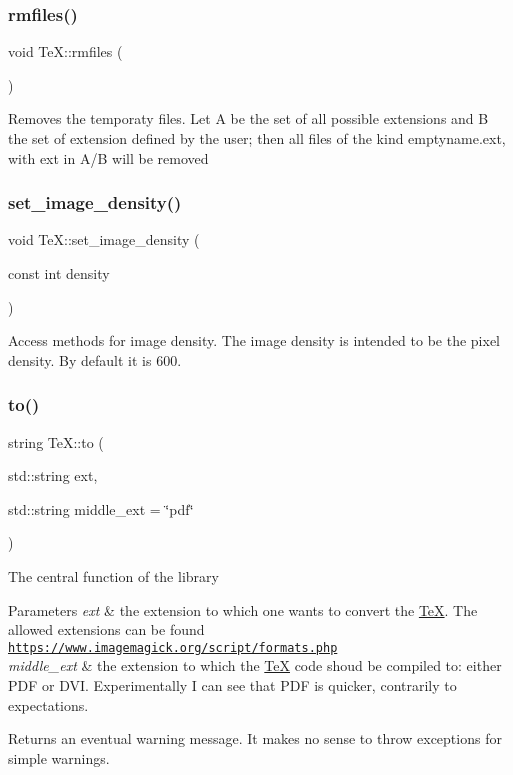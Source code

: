 \subsubsection{\texorpdfstring{rmfiles()}{rmfiles()}}
{\footnotesize\ttfamily void Te\+X\+::rmfiles (\begin{DoxyParamCaption}{ }\end{DoxyParamCaption})}

Removes the temporaty files. Let A be the set of all possible extensions and B the set of extension defined by the user; then all files of the kind emptyname.\+ext, with ext in A/B will be removed \mbox{\label{class_te_x_acc84be2a6474f7a354c0dbc5b312637f}} 
\subsubsection{\texorpdfstring{set\+\_\+image\+\_\+density()}{set\_image\_density()}}
{\footnotesize\ttfamily void Te\+X\+::set\+\_\+image\+\_\+density (\begin{DoxyParamCaption}\item[{const int}]{density }\end{DoxyParamCaption})}

Access methods for image density. The image density is intended to be the pixel density. By default it is 600. \mbox{\label{class_te_x_ad1602a89751db15a14ce7be506ed94b9}} 
\subsubsection{\texorpdfstring{to()}{to()}}
{\footnotesize\ttfamily string Te\+X\+::to (\begin{DoxyParamCaption}\item[{std\+::string}]{ext,  }\item[{std\+::string}]{middle\+\_\+ext = {\ttfamily \char`\"{}pdf\char`\"{}} }\end{DoxyParamCaption})}

The central function of the library


\begin{DoxyParams}{Parameters}
{\em ext} & the extension to which one wants to convert the \hyperlink{class_te_x}{TeX}. The allowed extensions can be found \href{https://www.imagemagick.org/script/formats.php}{\tt https\+://www.\+imagemagick.\+org/script/formats.\+php} \\
\hline
{\em middle\+\_\+ext} & the extension to which the \hyperlink{class_te_x}{TeX} code shoud be compiled to\+: either P\+DF or D\+VI. Experimentally I can see that P\+DF is quicker, contrarily to expectations.\\
\hline
\end{DoxyParams}
Returns an eventual warning message. It makes no sense to throw exceptions for simple warnings. \mbox{\label{class_te_x_a0480cb8479c2c5c3704d573c2b945d92}} 
